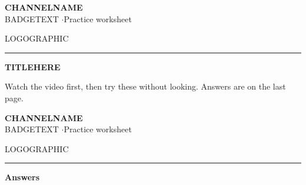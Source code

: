 \documentclass[11pt,a4paper]{article}
\newcommand{\header}{%
  \begin{minipage}[c]{0.6\textwidth}
    {\Large\bfseries CHANNELNAME}\\[2pt]
    {\color{soft} BADGETEXT \quad$\cdot$\quad Practice worksheet}
  \end{minipage}\hfill
  \begin{minipage}[c]{0.3\textwidth}\raggedleft
    LOGOGRAPHIC
  \end{minipage}\par
  {\color{accent}\rule{\textwidth}{2pt}}\par}
\newcounter{q}
\newcommand{\question}[2]{\stepcounter{q}\par\medskip
  \textbf{\arabic{q}.}\ #2 \hfill{\color{soft}\small[#1]}\par}
\begin{document}
\header
{\LARGE\bfseries %
TITLEHERE}\par
{\color{soft} Watch the video first, then try these without looking. Answers are on the last page.}\par
\medskip


\newpage
\header
{\Large\bfseries Answers}\par\medskip
\end{document}
